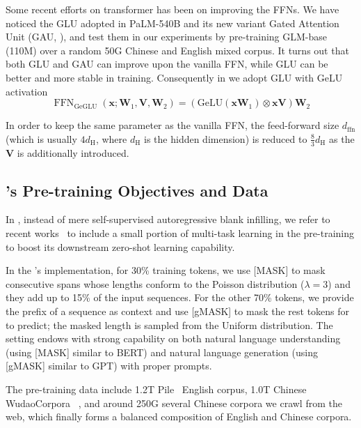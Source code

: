 {
Some recent efforts on transformer has been on improving the FFNs.
We have noticed the GLU adopted in PaLM-540B and its new variant Gated Attention Unit (GAU, \cite{hua2022transformer}), and test them in our experiments by pre-training GLM-base (110M) over a random 50G Chinese and English mixed corpus. 
It turns out that both GLU and GAU can improve upon the vanilla FFN, while GLU can be better and more stable in training.
Consequently in \glm we adopt GLU with GeLU~\citep{hendrycks2016gaussian} activation
\begin{equation}
\operatorname{FFN}_{\mathrm{GeGLU}}\left(\boldsymbol{x}; \boldsymbol{W}_1, \boldsymbol{V}, \boldsymbol{W}_{2}\right)=\left(\mathrm{GeLU}(\boldsymbol{x} \boldsymbol{W}_1) \otimes \boldsymbol{x} \boldsymbol{V}\right) \boldsymbol{W}_{2}
\end{equation}

In order to keep the same parameter as the vanilla FFN, the feed-forward size $d_{\mathrm{ffn}}$ (which is usually $4 d_{\mathrm{H}}$, where $d_{\mathrm{H}}$ is the hidden dimension) is reduced to $\frac 8 3 d_{\mathrm{H}}$ as the $\boldsymbol{V}$ is additionally introduced.

\subsection{\glm's Pre-training Objectives and Data}
In \glm, instead of mere self-supervised autoregressive blank infilling, we refer to recent works~\citep{aribandi2022ext5,wei2022finetuned,sanh2022multitask} to include a small portion of multi-task learning in the pre-training to boost its downstream zero-shot learning capability. 

In the \glm's implementation, for 30\% training tokens, we use [MASK] to mask consecutive spans whose lengths conform to the Poisson distribution ($\lambda=3$) and they add up to 15\% of the input sequences.
For the other 70\% tokens, we provide the prefix of a sequence as context and use [gMASK] to mask the rest tokens for \glm to predict; the masked length is sampled from the Uniform distribution.
The setting endows \glm with strong capability on both natural language understanding (using [MASK] similar to BERT) and natural language generation (using [gMASK] similar to GPT) with proper prompts.

The pre-training data include 1.2T Pile~\citep{gao2020pile} English corpus, 1.0T Chinese WudaoCorpora~\citep{yuan2021wudaocorpora} , and around 250G several Chinese corpora we crawl from the web, which finally forms a balanced composition of English and Chinese corpora.

}
